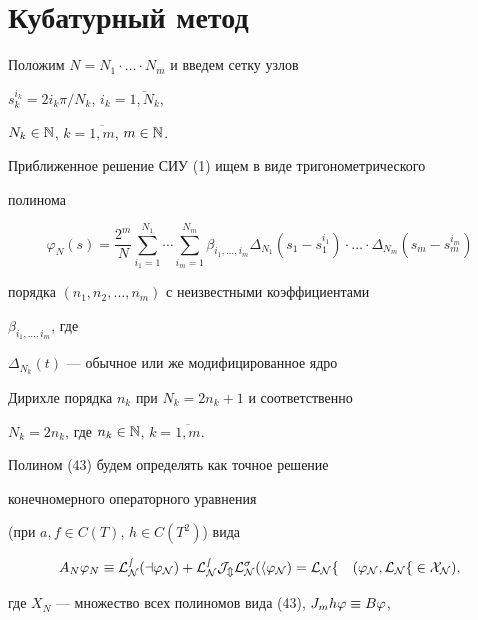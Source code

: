\section{Кубатурный метод}





Положим $N=N_1\cdot \dotsc \cdot N_m $ и введем сетку узлов


$s_k^{i_k}=2i_k\pi /N_k$, $i_k=\overline{1,N_k}$, 


$N_k\in \Bbb{N}$, $k=\overline{1,m}$, $m\in \Bbb{N} $.


Приближенное решение СИУ (1) ищем в виде тригонометрического


полинома


\begin{equation}


\varphi _N (s)=\frac{2^m}{N}\sum_{i_1=1}^{N_1}\dotsb \sum_{i_m=1}^{N_m}


\beta _{i_1,\dotsc,i_m}\Delta_{N_1}(s_1-s_1^{i_1})\cdot \dotsc\cdot


\Delta_{N_m}(s_m-s_m^{i_m})


\end{equation}


порядка $(n_1, n_2,\dotsc,n_m)$ с неизвестными коэффициентами


$\beta _{i_1,\dotsc,i_m} $, где


$\Delta_{N_k}(t)$ --- обычное или же модифицированное ядро


Дирихле порядка $n_k$ при $ N_k=2n_k+1 $ и соответственно


$N_k=2n_k$, где $ n_k\in \Bbb{N}$, $k=\overline{1,m} $.


Полином (43) будем определять как точное решение


конечномерного операторного уравнения


(при $ a, f\in C(T)$, $h\in C(T^2)$) вида


\begin{equation}


A_N\varphi _N\equiv \cal{L}_N^s(a\varphi _N)+


\cal{L}_N^sJ_m\cal{L}_N^\sigma (h\varphi _N)=


\cal{L}_N f\quad (\varphi _N , \cal{L}_N f\in X_N),


\end{equation}


где $ X_N $ --- множество всех полиномов вида (43), $J_m h\varphi\equiv B\varphi $,


$$


